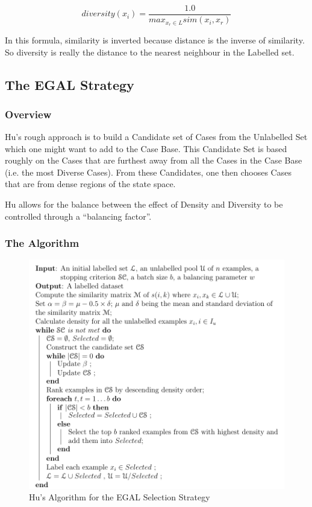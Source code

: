\documentclass[a4paper,11pt]{report}
\begin{document}
\[
diversity(x_{i})=\frac{1.0}{max_{x_{r}\in L}sim(x_{i},x_{r})}
\]

In this formula, similarity is inverted because distance is the inverse of similarity. So diversity is really the distance to the nearest neighbour in the Labelled set.

\subsection{The EGAL Strategy}

\subsubsection{Overview}
Hu's rough approach is to build a Candidate set of Cases from the Unlabelled Set which one might want to add to the Case Base. This Candidate Set is based roughly on the Cases that are furthest away from all the Cases in the Case Base (i.e. the most Diverse Cases). From these Candidates, one then chooses Cases that are from dense regions of the state space.

Hu allows for the balance between the effect of Density and Diversity to be controlled through a ``balancing factor''.

\begin{samepage}

\subsubsection{The Algorithm}
\begin{figure}[h!]
\includegraphics[scale=0.75]{./Others/Hu2011EgalAlgorithm}
\caption{Hu's Algorithm for the EGAL Selection Strategy}
\end{figure}

\end{samepage}
\end{document}
